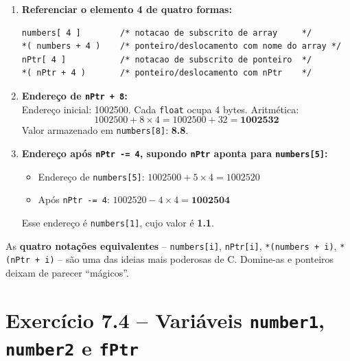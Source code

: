 \documentclass[12pt,a4paper]{article}
\begin{document}
\begin{respostabox}
\begin{enumerate}[label=\textbf{\alph*)}]
\item \textbf{Referenciar o elemento 4 de \textbf{quatro formas:}}
\begin{lstlisting}
numbers[ 4 ]        /* notacao de subscrito de array     */
*( numbers + 4 )    /* ponteiro/deslocamento com nome do array */
nPtr[ 4 ]           /* notacao de subscrito de ponteiro  */
*( nPtr + 4 )       /* ponteiro/deslocamento com nPtr    */
\end{lstlisting}

\item \textbf{Endereço de \texttt{nPtr + 8}:}\\
Endereço inicial: 1002500. Cada \texttt{float} ocupa 4 bytes. Aritmética:
\[
1002500 + 8 \times 4 = 1002500 + 32 = \mathbf{1002532}
\]
Valor armazenado em \texttt{numbers[8]}: \textbf{8.8}.

\item \textbf{Endereço após \texttt{nPtr -= 4}, supondo \texttt{nPtr} aponta para \texttt{numbers[5]}:}
\begin{itemize}[noitemsep]
  \item Endereço de \texttt{numbers[5]}: $1002500 + 5 \times 4 = 1002520$
  \item Após \texttt{nPtr -= 4}: $1002520 - 4 \times 4 = \mathbf{1002504}$
\end{itemize}
Esse endereço é \texttt{numbers[1]}, cujo valor é \textbf{1.1}.

\end{enumerate}

\begin{boaprática}
  As \textbf{quatro notações equivalentes} -- \texttt{numbers[i]}, \texttt{nPtr[i]},
  \texttt{*(numbers + i)}, \texttt{*(nPtr + i)} -- são uma das ideias mais
  poderosas de C. Domine-as e ponteiros deixam de parecer ``mágicos''.
\end{boaprática}
\end{respostabox}

\newpage

\section{Exercício 7.4 -- Variáveis \texttt{number1}, \texttt{number2} e \texttt{fPtr}}
\end{document}

